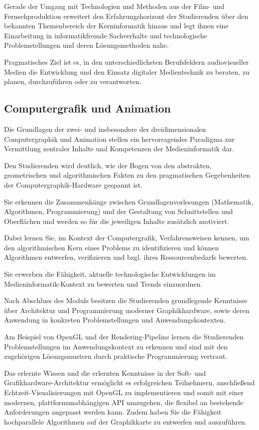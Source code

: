Gerade der Umgang mit Technologien und Methoden aus der Film- und
Fernsehproduktion erweitert den Erfahrungshorizont der Studierenden über
den bekannten Themenbereich der Kerninformatik hinaus und legt ihnen
eine Einarbeitung in informatikfremde Sachverhalte und technologische
Problemstellungen und deren Lösungsmethoden nahe.

Pragmatisches Ziel ist es, in den unterschiedlichsten Berufsfeldern
audiovisueller Medien die Entwicklung und den Einsatz digitaler
Medientechnik zu beraten, zu planen, durchzuführen oder zu verantworten.

\subsection*{Computergrafik und
Animation}\label{computergrafik-und-animation}

Die Grundlagen der zwei- und insbesondere der dreidimensionalen
Computergraphik und Animation stellen ein hervorragendes Paradigma zur
Vermittlung zentraler Inhalte und Kompetenzen der Medieninformatik dar.

Den Studierenden wird deutlich, wie der Bogen von den abstrakten,
geometrischen und algorithmischen Fakten zu den pragmatischen
Gegebenheiten der Computergraphik-Hardware gespannt ist.

Sie erkennen die Zusammenhänge zwischen Grundlagenvorlesungen
(Mathematik, Algorithmen, Programmierung) und der Gestaltung von
Schnittstellen und Oberflächen und werden so für die jeweiligen Inhalte
zusätzlich motiviert.

Dabei lernen Sie, im Kontext der Computergrafik, Verfahrensweisen
kennen, um den algorithmischen Kern eines Problems zu identifizieren und
können Algorithmen entwerfen, verifizieren und bzgl. ihres
Ressourcenbedarfs bewerten.

Sie erwerben die Fähigkeit, aktuelle technologische Entwicklungen im
Medieninformatik-Kontext zu bewerten und Trends einzuordnen.

Nach Abschluss des Moduls besitzen die Studierenden grundlegende
Kenntnisse über Architektur und Programmierung moderner Graphikhardware,
sowie deren Anwendung in konkreten Problemstellungen und
Anwendungskontexten.

Am Beispiel von OpenGL und der Rendering-Pipeline lernen die
Studierenden Problemstellungen im Anwendungskontext zu erkennen und sind
mit den zugehörigen Lösungsmustern durch praktische Programmierung
vertraut.

Das erlernte Wissen und die erlernten Kenntnisse in der Soft- und
Grafikhardware-Architektur ermöglicht es erfolgreichen Teilnehmern,
anschließend Echtzeit-Visualisierungen mit OpenGL zu implementieren und
somit mit einer modernen, plattformunabhängigen API umzugehen, die
flexibel an bestehende Anforderungen angepasst werden kann. Zudem haben
Sie die Fähigkeit hochparallele Algorithmen auf der Graphikkarte zu
entwerfen und auszuführen.

